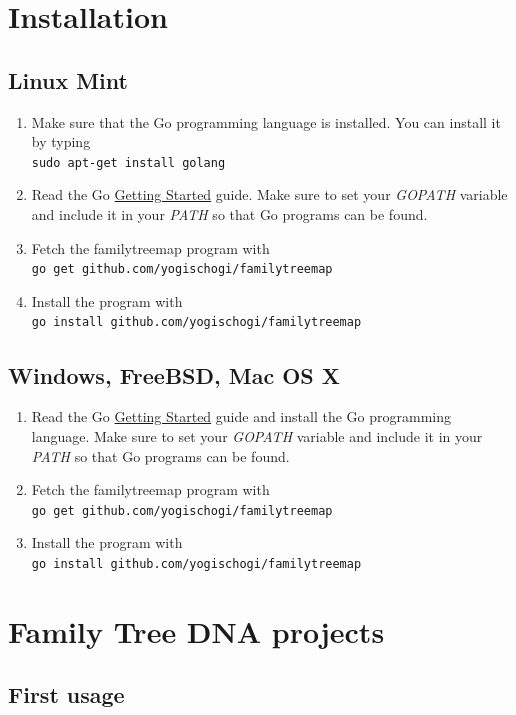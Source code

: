 \documentclass[12pt,a4paper]{article}
\begin{document}
\section{Installation}

\subsection{Linux Mint}
\begin{enumerate}
\item Make sure that the Go programming language is installed.
	You can install it by typing\\
	\texttt{sudo apt-get install golang}
\item Read the Go
	\href{http://golang.org/doc/install}{Getting Started}
	guide. Make sure to set your \emph{GOPATH} variable and
	include it in your \emph{PATH} so that Go programs can be
	found.
\item Fetch the familytreemap program with\\
	\texttt{go get github.com/yogischogi/familytreemap}
\item Install the program with\\
	 \texttt{go install github.com/yogischogi/familytreemap}
\end{enumerate}

\subsection{Windows, FreeBSD, Mac OS X}
\begin{enumerate}
\item Read the Go
	\href{http://golang.org/doc/install}{Getting Started}
	guide and install the Go programming language. 
	Make sure to set your \emph{GOPATH} variable and
	include it in your \emph{PATH} so that Go programs can be
	found.
\item Fetch the familytreemap program with\\
	\texttt{go get github.com/yogischogi/familytreemap}
\item Install the program with\\
	 \texttt{go install github.com/yogischogi/familytreemap}
\end{enumerate}


\section{Family Tree DNA projects}

\subsection{First usage}
\end{document}
